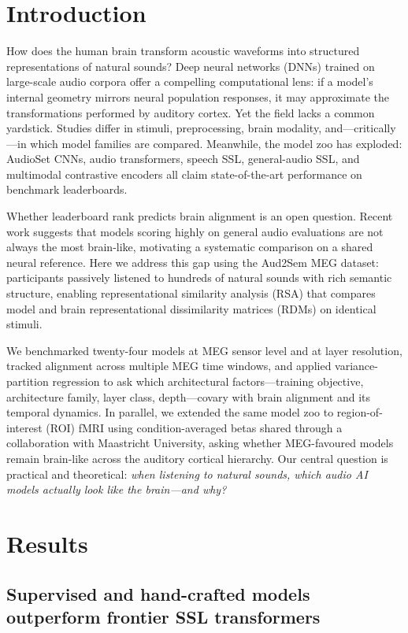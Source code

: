 \documentclass[11pt,a4paper]{article}
\begin{document}
\section{Introduction}

How does the human brain transform acoustic waveforms into structured representations of natural sounds? Deep neural networks (DNNs) trained on large-scale audio corpora offer a compelling computational lens: if a model's internal geometry mirrors neural population responses, it may approximate the transformations performed by auditory cortex. Yet the field lacks a common yardstick. Studies differ in stimuli, preprocessing, brain modality, and---critically---in which model families are compared. Meanwhile, the model zoo has exploded: AudioSet CNNs, audio transformers, speech SSL, general-audio SSL, and multimodal contrastive encoders all claim state-of-the-art performance on benchmark leaderboards.

Whether leaderboard rank predicts brain alignment is an open question. Recent work suggests that models scoring highly on general audio evaluations are not always the most brain-like, motivating a systematic comparison on a shared neural reference. Here we address this gap using the Aud2Sem MEG dataset: participants passively listened to hundreds of natural sounds with rich semantic structure, enabling representational similarity analysis (RSA) that compares model and brain representational dissimilarity matrices (RDMs) on identical stimuli.

We benchmarked twenty-four models at MEG sensor level and at layer resolution, tracked alignment across multiple MEG time windows, and applied variance-partition regression to ask which architectural factors---training objective, architecture family, layer class, depth---covary with brain alignment and its temporal dynamics. In parallel, we extended the same model zoo to region-of-interest (ROI) fMRI using condition-averaged betas shared through a collaboration with Maastricht University, asking whether MEG-favoured models remain brain-like across the auditory cortical hierarchy. Our central question is practical and theoretical: \emph{when listening to natural sounds, which audio AI models actually look like the brain---and why?}

\section{Results}

\subsection{Supervised and hand-crafted models outperform frontier SSL transformers}
\end{document}
